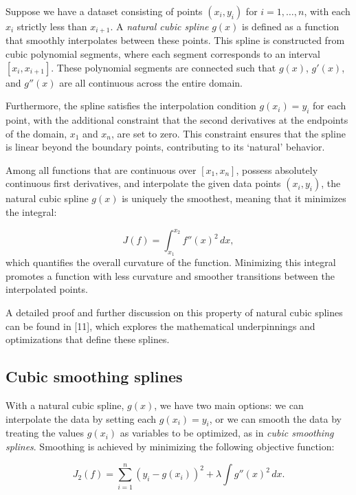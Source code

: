 \documentclass[
11pt, %
oneside, %
english, %
singlespacing, %
]{macthesis} %
\begin{document}
Suppose we have a dataset consisting of points \((x_i, y_i)\) for \(i = 1, \ldots, n\), with each \(x_i\) strictly less than \(x_{i+1}\). A \emph{natural cubic spline} \(g(x)\) is defined as a function that smoothly interpolates between these points. This spline is constructed from cubic polynomial segments, where each segment corresponds to an interval \([x_i, x_{i+1}]\). These polynomial segments are connected such that \(g(x)\), \(g'(x)\), and \(g''(x)\) are all continuous across the entire domain.

Furthermore, the spline satisfies the interpolation condition \(g(x_i) = y_i\) for each point, with the additional constraint that the second derivatives at the endpoints of the domain, \(x_1\) and \(x_n\), are set to zero. This constraint ensures that the spline is linear beyond the boundary points, contributing to its `natural' behavior.

Among all functions that are continuous over \([x_1, x_n]\), possess absolutely continuous first derivatives, and interpolate the given data points \((x_i, y_i)\), the natural cubic spline \(g(x)\) is uniquely the smoothest, meaning that it minimizes the integral:

\begin{equation}
J(f) = \int_{x_{1}}^{x_{2}} f''(x)^{2}\,dx,
\label{eq:min_smoothness}
\end{equation}
which quantifies the overall curvature of the function. Minimizing this integral promotes a function with less curvature and smoother transitions between the interpolated points.

A detailed proof and further discussion on this property of natural cubic splines can be found in {[}11{]}, which explores the mathematical underpinnings and optimizations that define these splines.

\subsection{Cubic smoothing splines}\label{Cubic-smoothing-splines}

With a natural cubic spline, \(g(x)\), we have two main options: we can interpolate the data by setting each \(g(x_i) = y_i\), or we can smooth the data by treating the values \(g(x_i)\) as variables to be optimized, as in \emph{cubic smoothing splines}. Smoothing is achieved by minimizing the following objective function:

\begin{equation}
J_{2}(f) = \sum_{i=1}^n (y_i - g(x_i))^2 + \lambda \int g''(x)^2 \, dx.
\label{eq:min_smoothness_obj}
\end{equation}
\end{document}
